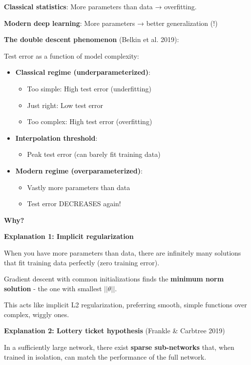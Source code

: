 \textbf{Classical statistics}: More parameters than data → overfitting.

\textbf{Modern deep learning}: More parameters → better generalization (!)

\textbf{The double descent phenomenon} (Belkin et al. 2019):

Test error as a function of model complexity:
\begin{itemize}
\item \textbf{Classical regime (underparameterized)}:
  \begin{itemize}
  \item Too simple: High test error (underfitting)
  \item Just right: Low test error
  \item Too complex: High test error (overfitting)
  \end{itemize}

\item \textbf{Interpolation threshold}:
  \begin{itemize}
  \item Peak test error (can barely fit training data)
  \end{itemize}

\item \textbf{Modern regime (overparameterized)}:
  \begin{itemize}
  \item Vastly more parameters than data
  \item Test error DECREASES again!
  \end{itemize}
\end{itemize}

\textbf{Why?}

\textbf{Explanation 1: Implicit regularization}

When you have more parameters than data, there are infinitely many solutions that fit training data perfectly (zero training error).

Gradient descent with common initializations finds the \textbf{minimum norm solution} - the one with smallest $||\theta||$.

This acts like implicit L2 regularization, preferring smooth, simple functions over complex, wiggly ones.

\textbf{Explanation 2: Lottery ticket hypothesis} (Frankle \& Carbtree 2019)

In a sufficiently large network, there exist \textbf{sparse sub-networks} that, when trained in isolation, can match the performance of the full network.

